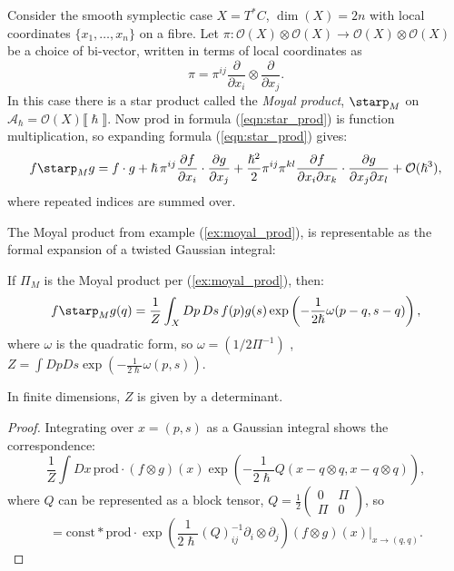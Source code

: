     \iffalse
    
    \fi 

    
    \begin{ex}
    \label{ex:moyal_prod} 
    Consider the smooth symplectic case \(X = T^{*}C\), \(\dim(X)=2n\) with local coordinates \(\{x_1,\dots,x_n\}\) on a fibre. 
    Let  \( \pi : \mathcal{O}(X) \otimes \mathcal{O}(X) \rightarrow \mathcal{O}(X)\otimes \mathcal{O}(X)\) be a choice of bi-vector, written in terms of local coordinates as
    \[ \pi = \pi^{ij} \frac{\partial}{\partial x_i} \otimes \frac{\partial}{\partial x_j }.\] 
    In this case there is a star product called the \emph{Moyal product}, \( \starp_M\) on \( \mathcal{A}_{\hslash} = \mathcal{O}(X)\lBrack \hslash \rBrack\). Now \( \mathrm{prod}\) in formula (\ref{eqn:star_prod}) is function multiplication, so expanding formula (\ref{eqn:star_prod}) gives:
    \[ f \starp_M g = f \cdot g + \hslash \, \pi^{ij} \frac{\partial f}{\partial x_i} \cdot  \frac{\partial g}{\partial x_j} + \frac{\hslash^2}{2} \pi^{ij} \pi^{kl}\frac{\partial f}{\partial x_i \partial x_k} \cdot \frac{\partial g}{\partial  x_j \partial x_l} + \mathcal{O}(\hslash^3),\]
    where repeated indices are summed over.
    \end{ex} 
    
    The Moyal product from example (\ref{ex:moyal_prod}), is representable as the formal expansion of a twisted Gaussian integral:
    \begin{lem}
    If \( \Pi_M \) is the Moyal product per (\ref{ex:moyal_prod}), then:
    \[f \starp_{M} g(q) = \frac{1}{Z} \int_X D p\, Ds\, f(p) g(s) \exp\left( -\frac{1}{2 \hslash} \omega(p-q, s-q) \right),\]
    where \(\omega\) is the quadratic form, so \( \omega =  (1/2 \Pi^{-1})\) , \( Z = \int D p Ds \exp\left( -\frac{1}{2 \hslash}  \omega(p,s)\right) \).  
    \end{lem}
    In finite dimensions, \(Z\) is given by a determinant. 
    \begin{proof}
    Integrating over \( x=(p,s)\) as a Gaussian integral shows the correspondence:
    \[  \frac{1}{Z} \int Dx \, \mathrm{prod} \cdot  (f \otimes g) (x) \exp \left( - \frac{1}{2\hslash} Q(x-q \otimes q,x-q\otimes q) \right), \]
    where \(Q\) can be represented as a block tensor, \(Q = \frac{1}{2}\left(\begin{array}{cc} 0 & \Pi \\ \Pi & 0 \end{array}\right) \), so  
    \[ = \mathrm{const} * \mathrm{prod} \cdot \exp\left( \frac{1}{2\hslash} (Q)^{-1}_{ij} \partial_i \otimes \partial_j \right) (f\otimes g)(x)  \big|_{x \rightarrow (q,q) }.\] 
    \end{proof}
    



